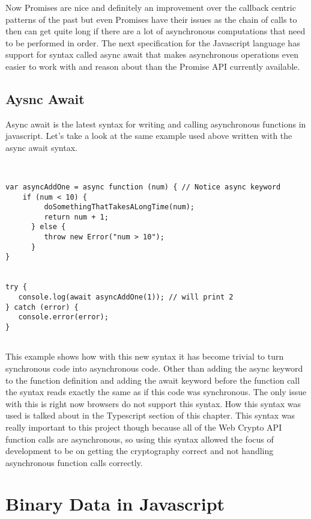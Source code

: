 Now Promises are nice and definitely an improvement over the callback centric patterns of the past but even Promises have their issues as the chain of calls to then can get quite long if there are a lot of asynchronous computations that need to be performed in order. The next specification for the Javascript language has support for syntax called async await that makes asynchronous operations even easier to work with and reason about than the Promise API currently available.


\subsection{Aysnc Await}


Async await is the latest syntax for writing and calling asynchronous functions in javascript. Let's take a look at the same example used above written with the async await syntax.\cite{js-asyncawait}


\begin{lstlisting}


var asyncAddOne = async function (num) { // Notice async keyword
    if (num < 10) {
         doSomethingThatTakesALongTime(num);
         return num + 1;
      } else {
         throw new Error("num > 10");
      }   
}   


try {
   console.log(await asyncAddOne(1)); // will print 2
} catch (error) {
   console.error(error);
}


\end{lstlisting}


This example shows how with this new syntax it has become trivial to turn synchronous code into asynchronous code. Other than adding the async keyword to the function definition and adding the await keyword before the function call the syntax reads exactly the same as if this code was synchronous. The only issue with this is right now browsers do not support this syntax. How this syntax was used is talked about in the Typescript section of this chapter. This syntax was really important to this project though because all of the Web Crypto API function calls are asynchronous, so using this syntax allowed the focus of development to be on getting the cryptography correct and not handling asynchronous function calls correctly.


\section{Binary Data in Javascript}


